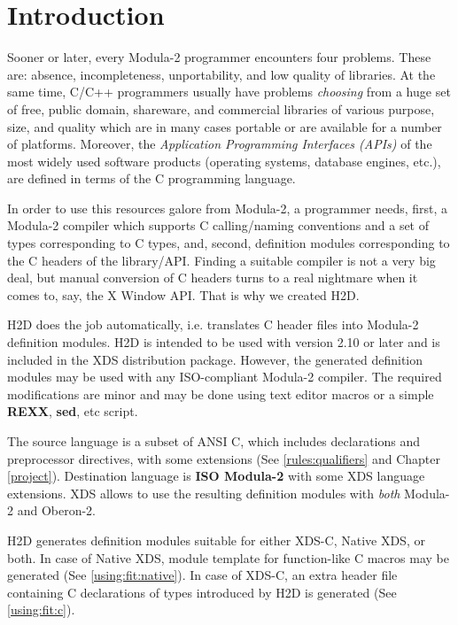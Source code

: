 \chapter{Introduction}
\label{intro}

Sooner or later, every Modula-2 programmer encounters four problems.
These are: absence, incompleteness, unportability, and low quality of
libraries. At the same time, C/C++ programmers usually have problems
{\em choosing} from a huge set of free, public domain, shareware, and
commercial libraries of various purpose, size, and quality which are
in many cases portable or are available for a number of platforms.
Moreover, the {\em Application Programming Interfaces (APIs)} of the
most widely used software products (operating systems, database engines,
etc.), are defined in terms of the C programming language.

In order to use this resources galore from Modula-2, a programmer needs, first,
a Modula-2 compiler which supports C calling/naming conventions and a set of
types corresponding to C types, and, second, definition modules
corresponding to the C headers of the library/API. Finding a suitable compiler
is not a very big deal, but manual conversion of C headers turns to a real
nightmare when it comes to, say, the X Window API. That is why we created H2D.

H2D does the job automatically, i.e. translates C header files into Modula-2
definition modules. H2D is intended to be used with
version 2.10 or later and is included in the XDS distribution package.
However, the generated definition modules may be used with any ISO-compliant
Modula-2 compiler. The required modifications are minor and may be done
using text editor macros or a simple {\bf REXX}, {\bf sed}, etc script.

The source language is a subset of ANSI C, which includes declarations and
preprocessor directives, with some extensions (See \ref{rules:qualifiers} and
Chapter \ref{project}).
Destination language is {\bf ISO Modula-2} with some XDS language extensions.
XDS allows to use the resulting definition modules with {\em both}
Modula-2 and Oberon-2.

H2D generates definition modules suitable for either XDS-C, Native XDS, or
both. In case of Native XDS, module template for function-like C macros
may be generated (See \ref{using:fit:native}). In case of XDS-C, an extra
header file containing C declarations of types introduced by H2D is generated
(See \ref{using:fit:c}).

